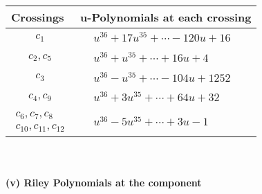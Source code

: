 \documentclass[1p]{elsarticle_modified}
\theoremstyle{definition}
\begin{document}
\begin{tabular}{m{50pt}|m{274pt}}
Crossings & \hspace{64pt}u-Polynomials at each crossing \\
\hline $$\begin{aligned}c_{1}\end{aligned}$$&$\begin{aligned}
&u^{36}+17 u^{35}+\cdots-120 u+16
\end{aligned}$\\
\hline $$\begin{aligned}c_{2},c_{5}\end{aligned}$$&$\begin{aligned}
&u^{36}+u^{35}+\cdots+16 u+4
\end{aligned}$\\
\hline $$\begin{aligned}c_{3}\end{aligned}$$&$\begin{aligned}
&u^{36}- u^{35}+\cdots-104 u+1252
\end{aligned}$\\
\hline $$\begin{aligned}c_{4},c_{9}\end{aligned}$$&$\begin{aligned}
&u^{36}+3 u^{35}+\cdots+64 u+32
\end{aligned}$\\
\hline $$\begin{aligned}c_{6},c_{7},c_{8}\\c_{10},c_{11},c_{12}\end{aligned}$$&$\begin{aligned}
&u^{36}-5 u^{35}+\cdots+3 u-1
\end{aligned}$\\
\hline
\end{tabular}\\~\\
\newpage\renewcommand{\arraystretch}{1}
\flushleft \textbf{(v) Riley Polynomials at the component}\newline \\
\end{document}
